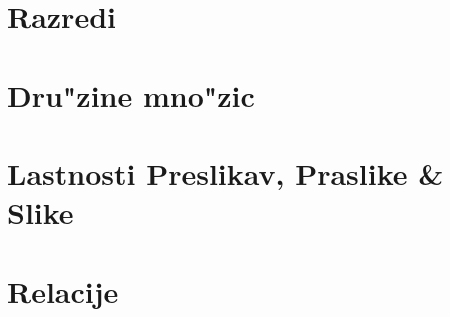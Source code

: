 \documentclass[a4paper, 12pt]{article}
\begin{document}
	\section{Razredi}
	
	
	\section{Dru"zine mno"zic}
	
	
	\section{Lastnosti Preslikav, Praslike \& Slike}
	
	
	\section{Relacije}
	
\end{document}
